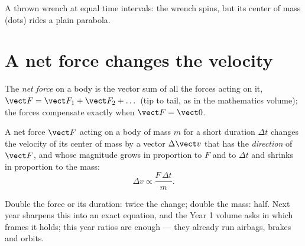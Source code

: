 \begin{omfigure}

{\small A thrown wrench at equal time intervals: the wrench spins, but
its center of mass (dots) rides a plain parabola.}
\end{omfigure}

\section{A net force changes the velocity}

\begin{definition}\label{def:g11:forces-and-motion:netforce}
The \emph{net force} on a body is the vector sum of
all the forces acting on it, $\vect F = \vect F_1 + \vect F_2 + \dots$
(tip to tail, as in the mathematics volume); the forces compensate
exactly when $\vect F = \vect 0$.
\end{definition}

\begin{theorem}\label{thm:g11:forces-and-motion:secondlaw}
A net force $\vect F$ acting on a body of mass $m$ for a short duration
$\Delta t$ changes the velocity of its center of mass by a vector
$\Delta \vect v$ that has the \emph{direction} of $\vect F$, and whose
magnitude grows in proportion to $F$ and to $\Delta t$ and shrinks in
proportion to the mass:
\[
\Delta v \propto \frac{F \, \Delta t}{m} .
\]
\end{theorem}
\admitted

\begin{remark}
Double the force or its duration: twice the change; double the mass:
half. Next year sharpens this into an exact equation, and the Year 1
volume asks in which frames it holds; this year ratios are enough ---
they already run airbags, brakes and orbits.
\end{remark}

